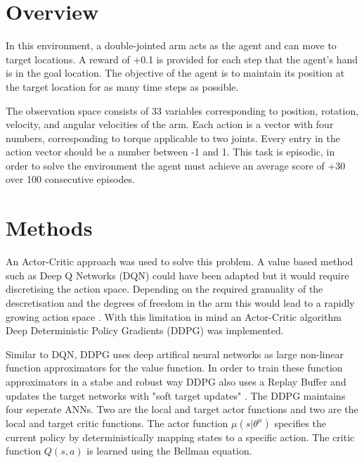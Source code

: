 \documentclass[12pt]{article}
\begin{document}
\maketitle


\section{Overview}
In this environment, a double-jointed arm acts as the agent and can move to target locations.
A reward of +0.1 is provided for each step that the agent's hand is in the goal location. 
The objective of the agent is to maintain its position at the target location for as many time steps as possible.

The observation space consists of 33 variables corresponding to position, rotation, velocity, and angular velocities of the arm. 
Each action is a vector with four numbers, corresponding to torque applicable to two joints. 
Every entry in the action vector should be a number between -1 and 1.
This task is episodic,  in order to solve the environment the agent must achieve an average score of +30 over 100 consecutive episodes.

\section{Methods}
\label{methods}
An Actor-Critic approach was used to solve this problem.
A value based method such as Deep Q Networks (DQN) \cite{dqn_paper} could have been adapted but it would require discretising the action space. 
Depending on the required granuality of the descretisation and the degrees of freedom in the arm this would lead to a rapidly growing action space \cite{curse_of_dimensionality}.
With this limitation in mind an Actor-Critic algorithm Deep Deterministic Policy Gradients (DDPG)\cite{ddpg_paper} was implemented.

Similar to DQN, DDPG uses deep artifical neural networks as large non-linear function approximators for the value function.
In order to train these function approximators in a stabe and robust way DDPG also uses a Replay Buffer\cite{experience_replay} and updates the target networks with "soft target updates" \cite{ddpg_paper}.
The DDPG maintains four seperate ANNs.
Two are the local and target actor functions and two are the local and target critic functions.
The actor function $\mu(s|\theta^{\mu})$ specifies the current policy by deterministically mapping states to a specific action.
The critic function $Q(s,a)$ is learned using the Bellman equation.
\end{document}
